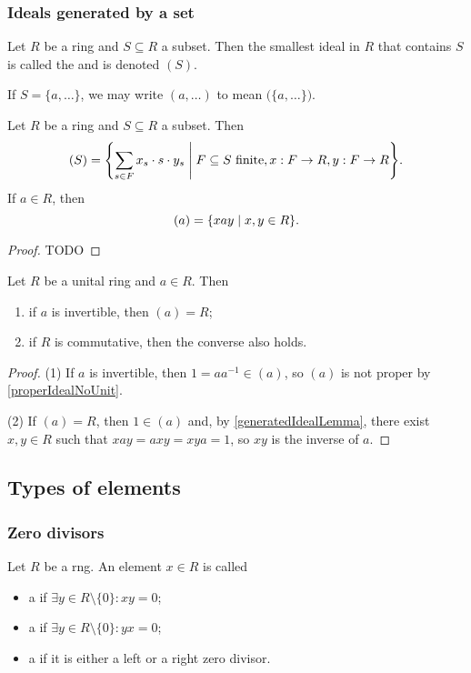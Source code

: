\subsubsection{Ideals generated by a set}
\begin{definition}
Let $R$ be a ring and $S\subseteq R$ a subset. Then the smallest ideal in $R$ that contains $S$ is called the  and is denoted $(S)$.

If $S= \{a, \ldots\}$, we may write $(a, \ldots)$ to mean $\big(\{a,\ldots \}\big)$.
\end{definition}

\begin{lemma} \label{generatedIdealLemma}
Let $R$ be a ring and $S\subseteq R$ a subset. Then
\[ (S) = \setbuilder{\sum_{s\in F}x_s\cdot s\cdot y_s}{\text{$F\subseteq S$ finite}, x:F\to R, y: F\to R}. \]
If $a\in R$, then
\[ (a) = \setbuilder{xay}{x,y\in R}. \]
\end{lemma}
\begin{proof}
TODO
\end{proof}

\begin{lemma} \label{nonInvertibleGeneratedIdeals}
Let $R$ be a unital ring and $a\in R$. Then
\begin{enumerate}
\item if $a$ is invertible, then $(a) = R$;
\item if $R$ is commutative, then the converse also holds.
\end{enumerate}
\end{lemma}
\begin{proof}
(1) If $a$ is invertible, then $1 = aa^{-1} \in (a)$, so $(a)$ is not proper by \ref{properIdealNoUnit}.

(2) If $(a) = R$, then $1\in (a)$ and, by \ref{generatedIdealLemma}, there exist $x,y\in R$ such that $xay = axy = xya = 1$, so $xy$ is the inverse of $a$.
\end{proof}


\subsection{Types of elements}
\subsubsection{Zero divisors}
\begin{definition}
Let $R$ be a rng. An element $x\in R$ is called
\begin{itemize}
\item a  if $\exists y \in R\setminus\{0\}: xy = 0$;
\item a  if $\exists y \in R\setminus\{0\}: yx = 0$;
\item a  if it is either a left or a right zero divisor.
\end{itemize}
\end{definition}

